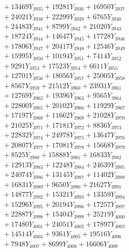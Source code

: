 \documentclass[a4paper,10pt]{article}
\begin{document}
{\begin{align}
&\;  + 13469 Y_{3935} + 19281 Y_{3936} + 16950 Y_{3937} \\[0.3ex]
&\;  + 24021 Y_{3938} + 22299 Y_{3939} + 6765 Y_{3940} \\[0.3ex]
&\;  + 24483 Y_{3941} + 8799 Y_{3942} + 21020 Y_{3943} \\[0.3ex]
&\;  + 18724 Y_{3944} + 14647 Y_{3945} + 17728 Y_{3946} \\[0.3ex]
&\;  + 17806 Y_{3947} + 20417 Y_{3948} + 12546 Y_{3949} \\[0.3ex]
&\;  + 15995 Y_{3950} + 10194 Y_{3951} + 7414 Y_{3952} \\[0.3ex]
&\;  + 9291 Y_{3953} + 17523 Y_{3954} + 6611 Y_{3955} \\[0.3ex]
&\;  + 12701 Y_{3956} + 18056 Y_{3957} + 25005 Y_{3958} \\[0.5ex]\allowbreak
&\;  + 8567 Y_{3959} + 21512 Y_{3960} + 23931 Y_{3961} \\[0.3ex]
&\;  + 12769 Y_{3962} + 19396 Y_{3963} + 9565 Y_{3964} \\[0.3ex]
&\;  + 22800 Y_{3965} + 20102 Y_{3966} + 11929 Y_{3967} \\[0.3ex]
&\;  + 17197 Y_{3968} + 11662 Y_{3969} + 21028 Y_{3970} \\[0.3ex]
&\;  + 21025 Y_{3971} + 17181 Y_{3972} + 8836 Y_{3973} \\[0.3ex]
&\;  + 22832 Y_{3974} + 24978 Y_{3975} + 13647 Y_{3976} \\[0.3ex]
&\;  + 20807 Y_{3977} + 17081 Y_{3978} + 15668 Y_{3979} \\[0.3ex]
&\;  + 8525 Y_{3980} + 15888 Y_{3981} + 16833 Y_{3982} \\[0.3ex]
&\;  + 12913 Y_{3983} + 12248 Y_{3984} + 24639 Y_{3985} \\[0.3ex]
&\;  + 24074 Y_{3986} + 13145 Y_{3987} + 11402 Y_{3988} \\[0.5ex]\allowbreak
&\;  + 16831 Y_{3989} + 9650 Y_{3990} + 21627 Y_{3991} \\[0.3ex]
&\;  + 14877 Y_{3992} + 15321 Y_{3993} + 13359 Y_{3994} \\[0.3ex]
&\;  + 15296 Y_{3995} + 20194 Y_{3996} + 17257 Y_{3997} \\[0.3ex]
&\;  + 22887 Y_{3998} + 15404 Y_{3999} + 25219 Y_{4000} \\[0.3ex]
&\;  + 17480 Y_{4001} + 24051 Y_{4002} + 17897 Y_{4003} \\[0.3ex]
&\;  + 14514 Y_{4004} + 9361 Y_{4005} + 19516 Y_{4006} \\[0.3ex]
&\;  + 7948 Y_{4007} + 8699 Y_{4008} + 16606 Y_{4009} \\[0.3ex]

\end{align}}
\end{document}
